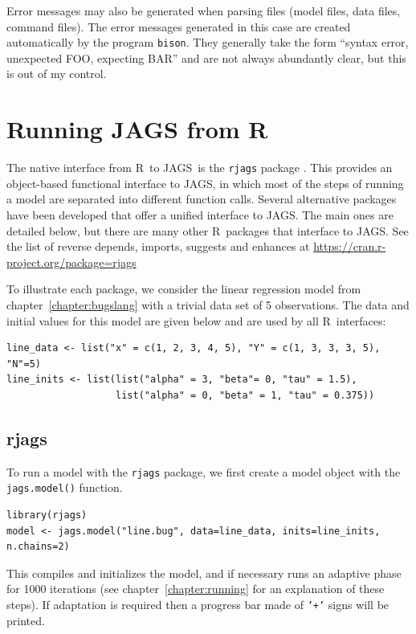 \documentclass[11pt, a4paper, titlepage]{report}
\newcommand{\JAGS}{\textsf{JAGS}}
\newcommand{\R}{\textsf{R}}
\begin{document}
Error messages may also be generated when parsing files (model files,
data files, command files).  The error messages generated in this case
are created automatically by the program \texttt{bison}. They
generally take the form ``syntax error, unexpected FOO, expecting BAR''
and are not always abundantly clear, but this is out of my control.

\chapter{Running JAGS from \R}
\label{chapter:R} 

The native interface from \R\ to \JAGS\ is the \texttt{rjags} package
\citep{Plummer2016}. This provides an object-based functional
interface to \JAGS, in which most of the steps of running a model are
separated into different function calls. Several alternative packages
have been developed that offer a unified interface to \JAGS. The
main ones are detailed below, but there are many other \R\ packages that
interface to \JAGS. See the list of reverse depends, imports, suggests
and enhances at \url{https://cran.r-project.org/package=rjags}

To illustrate each package, we consider the linear regression
model from chapter~\ref{chapter:bugslang} with a trivial data set
of 5 observations. The data and initial values for this model
are given below and are used by all \R\ interfaces:
\begin{verbatim}
line_data <- list("x" = c(1, 2, 3, 4, 5), "Y" = c(1, 3, 3, 3, 5), "N"=5)
line_inits <- list(list("alpha" = 3, "beta"= 0, "tau" = 1.5),
                   list("alpha" = 0, "beta" = 1, "tau" = 0.375))
\end{verbatim}

\section{rjags}
\label{section:R:rjags}

To run a model with the \texttt{rjags} package, we first create a model
object with the \texttt{jags.model()} function.
\begin{verbatim}
library(rjags)
model <- jags.model("line.bug", data=line_data, inits=line_inits, n.chains=2)
\end{verbatim}
This compiles and initializes the model, and if necessary runs an
adaptive phase for 1000 iterations (see chapter~\ref{chapter:running}
for an explanation of these steps). If adaptation is required then a
progress bar made of \texttt{'+'} signs will be printed.
\end{document}
